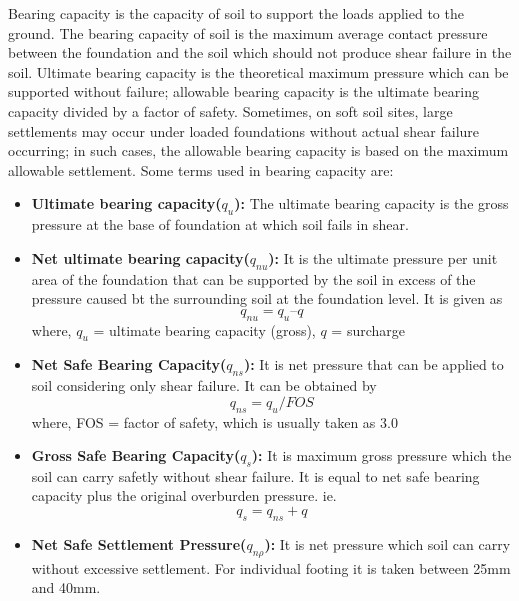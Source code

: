 Bearing capacity is the capacity of soil to support the loads applied to the ground. The bearing capacity of soil is the maximum average contact pressure between the foundation and the soil which should not produce shear failure in the soil. Ultimate bearing capacity is the theoretical maximum pressure which can be supported without failure; allowable bearing capacity is the ultimate bearing capacity divided by a factor of safety. Sometimes, on soft soil sites, large settlements may occur under loaded foundations without actual shear failure occurring; in such cases, the allowable bearing capacity is based on the maximum allowable settlement. Some terms used in bearing capacity are:
\begin{itemize}
\item \textbf{Ultimate bearing capacity($q_u$):} The ultimate bearing capacity is the gross pressure at the base of foundation at which soil fails in shear.

\item \textbf{Net ultimate bearing capacity($q_{nu}$):} It is the ultimate pressure per unit area of the foundation that can be supported by the soil in excess of the pressure caused bt the surrounding soil at the foundation level. It is given as
\begin{equation}
q_{nu} = q_u – q
\end{equation}
where, $q_u$ = ultimate bearing capacity (gross), $q$ = surcharge

\item \textbf{Net Safe Bearing Capacity($q_{ns}$):} It is net pressure that can be applied to soil considering only shear failure. It can be obtained by
\begin{equation}
q_{ns} = q_u / FOS 
\end{equation}
where, FOS = factor of safety, which is usually taken as 3.0

\item \textbf{Gross Safe Bearing Capacity($q_{s}$):} It is maximum gross pressure which the soil can carry safetly without shear failure. It is equal to net safe bearing capacity plus the original overburden pressure. ie.
\begin{equation}
q_s = q_{ns} + q
\end{equation}

\item \textbf{Net Safe Settlement Pressure($q_{n\rho}$):} It is net pressure which soil can carry without excessive settlement. For individual footing it is taken between 25mm and 40mm.


\end{itemize}
